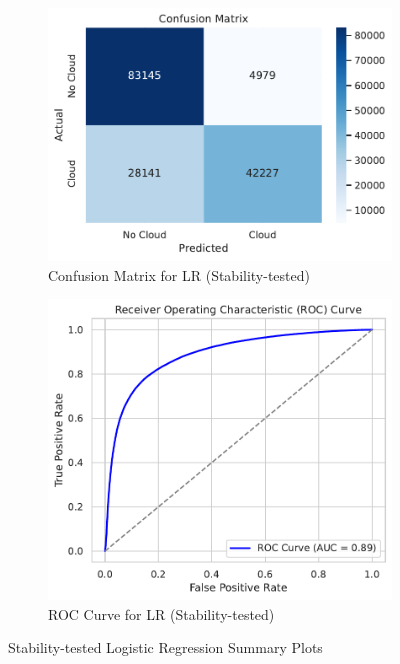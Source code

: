 \documentclass[11pt,letterpaper]{article}
\begin{document}
\begin{figure}[H]
  \centering
  \begin{subfigure}[b]{0.48\textwidth}
      \centering
      \includegraphics[width=\textwidth]{figs/sc1.pdf}
      \caption{Confusion Matrix for LR (Stability-tested)}
      \label{fig:stability_CM}
  \end{subfigure}
  \hfill
  \begin{subfigure}[b]{0.48\textwidth}
      \centering
      \includegraphics[width=\textwidth]{figs/sc2.pdf}
      \caption{ROC Curve for LR (Stability-tested)}
      \label{fig:stabiltiy_ROC}
  \end{subfigure}
  \caption{Stability-tested Logistic Regression Summary Plots}
  \label{fig:stability_plots}
\end{figure}\noindent
\end{document}
